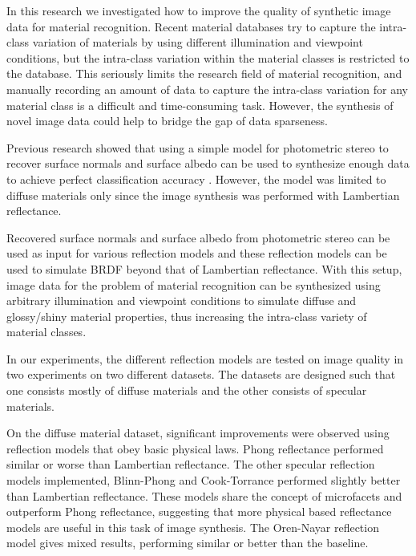 \hypertarget{Conclusion \& Future Work}{
}

In this research we investigated how to improve the quality of synthetic image data for material recognition. Recent material databases try to capture the intra-class variation of materials by using different illumination and viewpoint conditions, but the intra-class variation within the material classes is restricted to the database. This seriously limits the research field of material recognition, and manually recording an amount of data to capture the intra-class variation for any material class is a difficult and time-consuming task. However, the synthesis of novel image data could help to bridge the gap of data sparseness.

Previous research showed that using a simple model for photometric stereo to recover surface normals and surface albedo can be used to synthesize enough data to achieve perfect classification accuracy \cite{Targhi}. However, the model was limited to diffuse materials only since the image synthesis was performed with Lambertian reflectance. 

Recovered surface normals and surface albedo from photometric stereo can be used as input for various reflection models and these reflection models can be used to simulate BRDF beyond that of Lambertian reflectance. With this setup, image data for the problem of material recognition can be synthesized using arbitrary illumination and viewpoint conditions to simulate diffuse and glossy/shiny material properties, thus increasing the intra-class variety of material classes.

In our experiments, the different reflection models are tested on image quality in two experiments on two different datasets. The datasets are designed such that one consists mostly of diffuse materials and the other consists of specular materials. 

On the diffuse material dataset, significant improvements were observed using reflection models that obey basic physical laws. Phong reflectance performed similar or worse than Lambertian reflectance. The other specular reflection models implemented, Blinn-Phong and Cook-Torrance performed slightly better than Lambertian reflectance. These models share the concept of microfacets and outperform Phong reflectance, suggesting that more physical based reflectance models are useful in this task of image synthesis. The Oren-Nayar reflection model gives mixed results, performing similar or better than the baseline.

